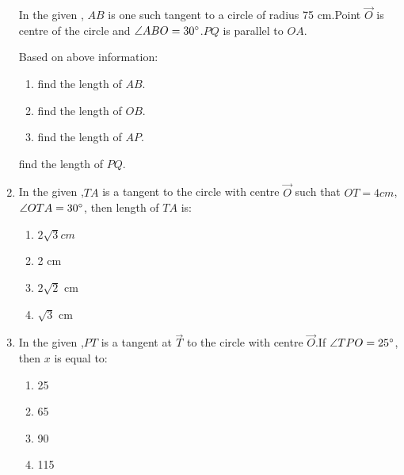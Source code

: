 \documentclass[12pt,A4 paper]{article}
\begin{document}
\begin{enumerate}
In the given , $AB$ is one such tangent to a circle of radius 75 cm.Point $\vec{ O}$ is centre of the circle and $\angle ABO= 30\degree$.$PQ$ is parallel to $OA$.



\begin{figure}[H]
	        \centering
	        
		\caption{}
		\label{fig:fig:7}
        \end{figure}



Based on above information:

           \begin{enumerate}
		   \item find the length of $AB$.
		   \item find the length of $OB$.
		   \item find the length of $AP$.
         \end{enumerate}


find the length of $PQ$.



\item In the given ,$TA$ is a tangent to the circle with centre $\vec{O}$ such that $OT=4cm$, $\angle OTA= 30\degree$, then length of $TA$ is:
      \begin{enumerate}
          \item $2\sqrt3 cm$
          \item 2 cm
          \item $2\sqrt2$ cm
          \item $\sqrt3$ cm
      \end{enumerate}




  \begin{figure}[H]
	\centering
	
	\caption{}
	\label{fig:fig:8}
  \end{figure}





\item In the given ,$PT$ is a tangent at $\vec{T}$ to the circle with centre $\vec{O}$.If $\angle TPO=25\degree$, then $x$ is equal to:
   \begin{enumerate}
       \item 25\degree
       \item 65\degree
       \item 90\degree
       \item 115\degree
       

\end{enumerate}
\end{enumerate}
\end{document}
